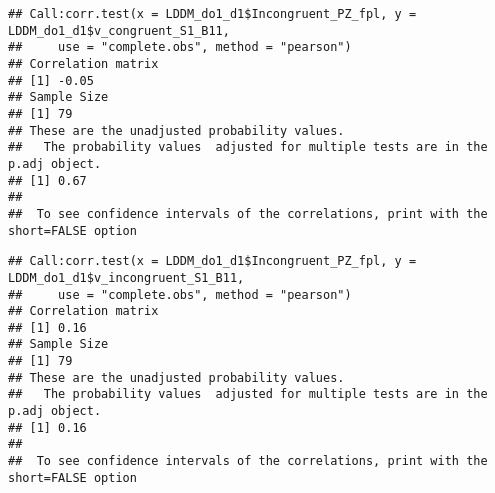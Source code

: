 \documentclass[
]{article}
\newenvironment{Shaded}{\begin{snugshade}}{\end{snugshade}}
\newcommand{\AttributeTok}[1]{\textcolor[rgb]{0.77,0.63,0.00}{#1}}
\newcommand{\FunctionTok}[1]{\textcolor[rgb]{0.00,0.00,0.00}{#1}}
\newcommand{\NormalTok}[1]{#1}
\newcommand{\SpecialCharTok}[1]{\textcolor[rgb]{0.00,0.00,0.00}{#1}}
\newcommand{\StringTok}[1]{\textcolor[rgb]{0.31,0.60,0.02}{#1}}
\begin{document}
\begin{Shaded}
\end{Shaded}

\begin{verbatim}
## Call:corr.test(x = LDDM_do1_d1$Incongruent_PZ_fpl, y = LDDM_do1_d1$v_congruent_S1_B11, 
##     use = "complete.obs", method = "pearson")
## Correlation matrix 
## [1] -0.05
## Sample Size 
## [1] 79
## These are the unadjusted probability values.
##   The probability values  adjusted for multiple tests are in the p.adj object. 
## [1] 0.67
## 
##  To see confidence intervals of the correlations, print with the short=FALSE option
\end{verbatim}

\begin{Shaded}
\end{Shaded}

\begin{verbatim}
## Call:corr.test(x = LDDM_do1_d1$Incongruent_PZ_fpl, y = LDDM_do1_d1$v_incongruent_S1_B11, 
##     use = "complete.obs", method = "pearson")
## Correlation matrix 
## [1] 0.16
## Sample Size 
## [1] 79
## These are the unadjusted probability values.
##   The probability values  adjusted for multiple tests are in the p.adj object. 
## [1] 0.16
## 
##  To see confidence intervals of the correlations, print with the short=FALSE option
\end{verbatim}

\begin{Shaded}
\end{Shaded}
\end{document}
